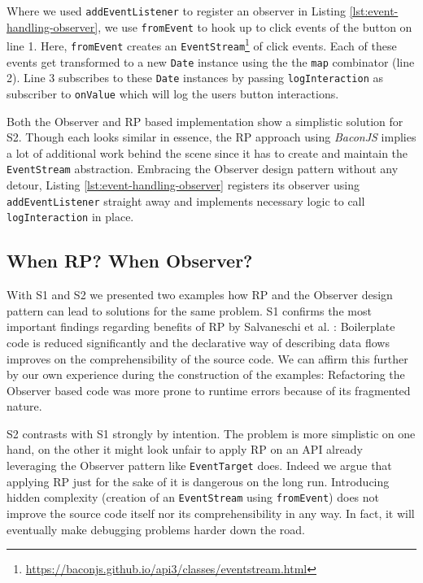 \documentclass[12pt,a4paper]{article}
\begin{document}
Where we used \texttt{addEventListener} to register an observer in Listing \ref{lst:event-handling-observer}, we use \texttt{fromEvent} to hook up to click events of the button on line 1. Here, \texttt{fromEvent} creates an \texttt{EventStream}\footnote{\url{https://baconjs.github.io/api3/classes/eventstream.html}} of click events. Each of these events get transformed to a new \texttt{Date} instance using the the \texttt{map} combinator (line 2). Line 3 subscribes to these \texttt{Date} instances by passing \texttt{logInteraction} as subscriber to \texttt{onValue} which will log the users button interactions.

Both the Observer and RP based implementation show a simplistic solution for S2. Though each looks similar in essence, the RP approach using \emph{BaconJS} implies a lot of additional work behind the scene since it has to create and maintain the \texttt{EventStream} abstraction. Embracing the Observer design pattern without any detour, Listing \ref{lst:event-handling-observer} registers its observer using \texttt{addEventListener} straight away and implements necessary logic to call \texttt{logInteraction} in place.


\subsection{When RP? When Observer?}
\label{sec:when-rp-when-observer}

With S1 and S2 we presented two examples how RP and the Observer design pattern can lead to solutions for the same problem. S1 confirms the most important findings regarding benefits of RP by Salvaneschi et al. \cite{7827078}: Boilerplate code is reduced significantly and the declarative way of describing data flows improves on the comprehensibility of the source code. We can affirm this further by our own experience during the construction of the examples: Refactoring the Observer based code was more prone to runtime errors because of its fragmented nature.

S2 contrasts with S1 strongly by intention. The problem is more simplistic on one hand, on the other it might look unfair to apply RP on an API already leveraging the Observer pattern like \texttt{EventTarget} does. Indeed we argue that applying RP just for the sake of it is dangerous on the long run. Introducing hidden complexity (creation of an \texttt{EventStream} using \texttt{fromEvent}) does not improve the source code itself nor its comprehensibility in any way. In fact, it will eventually make debugging problems harder down the road.
\end{document}
